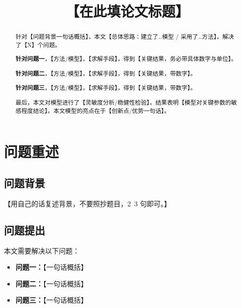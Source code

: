 \documentclass{cumcmthesis}
\title{【在此填论文标题】}
\begin{document}
\maketitle

\begin{abstract}
针对【问题背景一句话概括】，本文【总体思路：建立了…模型 / 采用了…方法】，解决了【N】个问题。

\textbf{针对问题一}，【方法/模型】，【求解手段】，得到【关键结果，务必带具体数字与单位】。

\textbf{针对问题二}，【方法/模型】，【求解手段】，得到【关键结果，带数字】。

\textbf{针对问题三}，【方法/模型】，【求解手段】，得到【关键结果，带数字】。

最后，本文对模型进行了【灵敏度分析/稳健性检验】，结果表明【模型对关键参数的敏感程度结论】。本文模型的亮点在于【创新点/优势一句话】。

\end{abstract}


\section{问题重述}
\subsection{问题背景}
【用自己的话复述背景，不要照抄题目，2~3 句即可。】

\subsection{问题提出}
本文需要解决以下问题：
\begin{itemize}
    \item \textbf{问题一：}【一句话概括】
    \item \textbf{问题二：}【一句话概括】
    \item \textbf{问题三：}【一句话概括】
\end{itemize}
\end{document}
